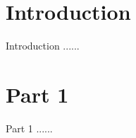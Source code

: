 \documentclass{beamer}
\begin{document}
\section{Introduction}
\begin{frame}{Introduction}
  ......
\end{frame}

\section{Part 1}
\begin{frame}{Part 1}
   ......
\end{frame}
\end{document}
